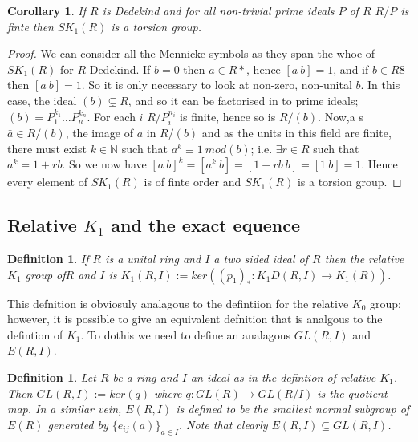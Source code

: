 \documentclass[a4paper,10pt]{article}
\newtheorem{defn}[thm]{Definition}
\newtheorem{cor}[thm]{Corollary}
\begin{document}
\begin{cor}
If $R$ is Dedekind and for all non-trivial prime ideals $P$ of $R$ $R/P$ is finte then $SK_{1}(R)$ is a torsion group.
\end{cor}
\begin{proof}
We can consider all the Mennicke symbols as they span the whoe of $SK_{1}(R)$ for $R$ Dedekind. If $b=0$ then $a\in R*$, hence $[a\ b]=1$, and if $b\in R8$ then $[a\ b]=1$. So it is only necessary to look at non-zero, non-unital $b$.
In this case, the ideal $(b)\subsetneq R$, and so it can be factorised in to prime ideals; $(b)=P_{1}^{k_{1}}\ldots P_{n}^{k_{n}}$. For each $i$ $R/P_{i}^{n_{i}}$ is finite, hence so is $R/(b)$. Now,a s $\bar{a}\in R/(b)$, the image of $a$ in $R/(b)$ and as the units in this field are finite, there must exist $k\in \mathbb{N}$ such that $a^{k}\equiv 1\ mod(b)$; i.e. $\exists r\in R$ such that $a^{k}=1+rb$. So we now have $[a\ b]^{k}=[a^{k}\ b]=[1+rb\ b]=[1\ b]=1$.
Hence every element of $SK_{1}(R)$ is of finte order and $SK_{1}(R)$ is a torsion group.
\end{proof}


\subsection{Relative $K_{1}$ and the exact equence}

\begin{defn}
If $R$ is a unital ring and $I$ a two sided ideal of $R$ then the relative $K_{1}$ group of$R$ and $I$ is $K_{1}(R,I):=ker((p_{1})_{*}:K_{1}D(R,I)\rightarrow K_{1}(R))$.
\end{defn}

This defnition is obviosuly analagous to the defintiion for the relative $K_{0}$ group; however, it is possible to give an equivalent defnition that is analgous to the defintion of $K_{1}$. To dothis we need to define an analagous $GL(R,I)$ and $E(R,I)$.

\begin{defn}
Let $R$ be a ring and $I$ an ideal as in the defintion of relative $K_{1}$. Then $GL(R,I):=ker(q)$ where $q:GL(R)\rightarrow GL(R/I)$ is the quotient map. In a similar vein, $E(R,I)$ is defined to be the smallest normal subgroup of $E(R)$ generated by $\{e_{ij}(a)\}_{a\in I}$. Note that clearly $E(R,I)\subseteq GL(R,I)$.
\end{defn}
\end{document}
